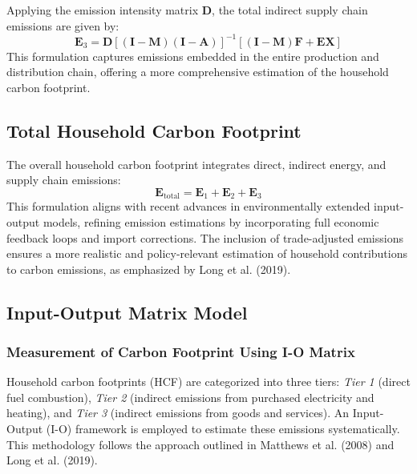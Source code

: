 \documentclass[12pt,a4paper]{article}%
\begin{document}
Applying the emission intensity matrix \( \mathbf{D} \), the total indirect supply chain emissions are given by:
\begin{equation}
    \mathbf{E}_3 = \mathbf{D} {[(\mathbf{I} - \mathbf{M}) (\mathbf{I} - \mathbf{A})]}^{-1} [(\mathbf{I} - \mathbf{M}) \mathbf{F} + \mathbf{EX}]
\end{equation}
This formulation captures emissions embedded in the entire production and distribution chain, offering a more comprehensive estimation of the household carbon footprint.

\subsection{Total Household Carbon Footprint}
The overall household carbon footprint integrates direct, indirect energy, and supply chain emissions:
\begin{equation}
    \mathbf{E}_{\text{total}} = \mathbf{E}_1 + \mathbf{E}_2 + \mathbf{E}_3
\end{equation}
This formulation aligns with recent advances in environmentally extended input-output models, refining emission estimations by incorporating full economic feedback loops and import corrections. The inclusion of trade-adjusted emissions ensures a more realistic and policy-relevant estimation of household contributions to carbon emissions, as emphasized by Long et al. (2019).
\subsection{Input-Output Matrix Model}

\subsubsection*{Measurement of Carbon Footprint Using I-O Matrix}

Household carbon footprints (HCF) are categorized into three tiers: \textit{Tier 1} (direct fuel combustion), \textit{Tier 2} (indirect emissions from purchased electricity and heating), and \textit{Tier 3} (indirect emissions from goods and services). An Input-Output (I-O) framework is employed to estimate these emissions systematically. This methodology follows the approach outlined in Matthews et al. (2008) and Long et al. (2019).
\end{document}
